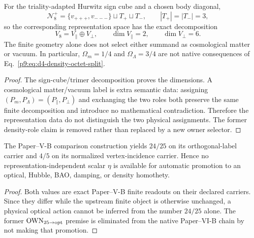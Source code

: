 \documentclass[12pt,a4paper]{article}
\begin{document}
\begin{theorem}
\label{p9:thm:d4-pure-density-projector}
For the triality-adapted Hurwitz sign cube and a chosen body diagonal,
\[
\mathcal N_8^+
=\{v_{+++},v_{---}\}\sqcup T_+\sqcup T_-,
\qquad |T_+|=|T_-|=3,
\]
so the corresponding representation space has the exact decomposition
\begin{equation}
\label{p9:eq:d4-density-octet-split}
V_8=V_\parallel\oplus V_\perp,
\qquad \dim V_\parallel=2,
\qquad \dim V_\perp=6.
\end{equation}
The finite geometry alone does not select either summand as cosmological matter
or vacuum.  In particular, \(\Omega_m=1/4\) and \(\Omega_\Lambda=3/4\) are not
native consequences of Eq.~\eqref{p9:eq:d4-density-octet-split}.
\end{theorem}

\begin{proof}
The sign-cube/trimer decomposition proves the dimensions.  A cosmological
matter/vacuum label is extra semantic data: assigning
\((P_m,P_\Lambda)=(P_\parallel,P_\perp)\) and exchanging the two roles both
preserve the same finite decomposition and introduce no mathematical
contradiction.  Therefore the representation data do not distinguish the two
physical assignments.  The former density-role claim is removed rather than
replaced by a new owner selector.
\end{proof}

\begin{lemma}
\label{p9:lem:typed-determinant-readout-functor}
The Paper--V-B comparison construction yields \(24/25\) on its orthogonal-label
carrier and \(4/5\) on its normalized vertex-incidence carrier.  Hence no
representation-independent scalar \(\eta\) is available for automatic
promotion to an optical, Hubble, BAO, damping, or density homothety.
\end{lemma}

\begin{proof}
Both values are exact Paper--V-B finite readouts on their declared carriers.
Since they differ while the upstream finite object is otherwise unchanged, a
physical optical action cannot be inferred from the number \(24/25\) alone.
The former \(\mathrm{OWN}_{25\to\rm opt}\) premise is eliminated from the
native Paper--VI-B chain by not making that promotion.
\end{proof}
\end{document}
